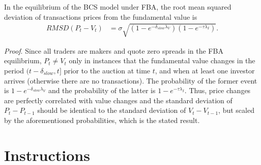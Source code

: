 \documentclass[12pt]{article}
\begin{document}
\begin{appendices}
\begin{proposition} \label{rmsdFBA}
In the equilibrium of the BCS model under FBA, the root mean squared deviation of transactions prices from the fundamental value is
\begin{align}
RMSD(P_t-V_t) & = \sigma \sqrt{ \left(1-e^{-\delta_{slow} \lambda_V}\right)  \left( 1-e^{-\tau \lambda_I} \right)}. \label{rmsdFBAEq}
\end{align}
\end{proposition}

\noindent \emph{Proof}. Since all traders are makers and quote zero spreads in the FBA equilibrium, $P_t \neq V_t$ only in instances that the fundamental value changes in the period $(t-\delta_{slow},t]$ prior to the auction at time $t$, and when at least one investor arrives (otherwise there are no transactions). The probability of the former event is $1-e^{-\delta_{slow} \lambda_V}$ and the probability of the latter is $1-e^{-\tau \lambda_I}$. Thus, price changes are perfectly correlated with value changes and the standard deviation of $P_t -P_{t-1}$ should be identical to the standard deviation of $V_t-V_{t-1}$, but scaled by the aforementioned probabilities, which is the stated result.

\newpage

\section{Instructions}
\label{sec:instructions}




\end{appendices}
\end{document}
